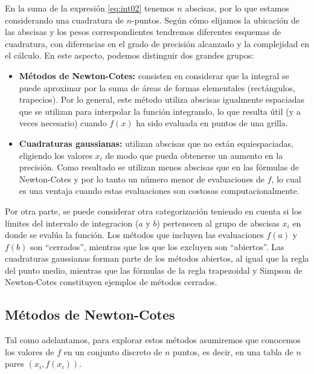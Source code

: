 En la suma de la expresión \eqref{eq:int02} tenemos $n$ abscisas, por lo que estamos considerando una cuadratura de $n$-puntos. Según cómo elijamos la ubicación de las abscisas y los pesos correspondientes tendremos diferentes esquemas de cuadratura, con diferencias en el grado de precisión alcanzado y la complejidad en el cálculo. En este aspecto, podemos distinguir dos grandes grupos:
\begin{itemize}
 \item \textbf{Métodos de Newton-Cotes:} consisten en considerar que la integral se puede aproximar por la suma de áreas de formas elementales (rectángulos, trapecios). Por lo general, este método utiliza abscisas igualmente espaciadas que se utilizan para interpolar la función integrando, lo que resulta útil (y a veces necesario) cuando $f(x)$ ha sido evaluada en puntos de una grilla.
 \item \textbf{Cuadraturas gaussianas:} utilizan abscisas que no están equiespaciadas, eligiendo los valores $x_i$ de modo que pueda obtenerse un aumento en la precisión. Como resultado se utilizan menos abscisas que en las fórmulas de Newton-Cotes y por lo tanto un número menor de evaluaciones de $f$, lo cual es una ventaja cuando estas evaluaciones son costosas computacionalmente.
\end{itemize}

Por otra parte, se puede considerar otra categorización teniendo en cuenta si los límites del intervalo de integracion ($a$ y $b$) pertenecen al grupo de abscisas $x_i$ en donde se evalúa la función. Los métodos que incluyen las evaluaciones $f(a)$ y $f(b)$ son ``cerrados'', mientras que los que los excluyen son ``abiertos''. Las cuadraturas gaussianas forman parte de los métodos abiertos, al igual que la regla del punto medio, mientras que las fórmulas de la regla trapezoidal y Simpson de Newton-Cotes constituyen ejemplos de métodos cerrados.


\subsection{Métodos de Newton-Cotes}
Tal como adelantamos, para explorar estos métodos asumiremos que conocemos los valores de $f$ en un conjunto discreto de $n$ puntos, es decir, en una tabla de $n$ pares $(x_i, f(x_i))$.

